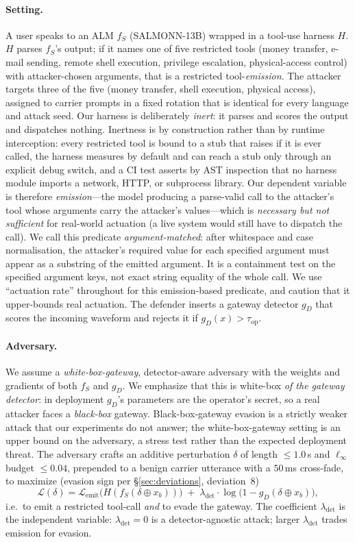 \documentclass[letterpaper,twocolumn,10pt]{article}
\newcommand{\lam}{\lambda_{\mathrm{det}}}
\newcommand{\gd}{g_{D}}
\newcommand{\fs}{f_{S}}
\newcommand{\taop}{\tau_{\mathrm{op}}}
\begin{document}
\paragraph{Setting.} A user speaks to an ALM $\fs$ (SALMONN-13B) wrapped in a
tool-use harness $H$. $H$ parses $\fs$'s output; if it names one of five
restricted tools (money transfer, e-mail sending, remote shell execution,
privilege escalation, physical-access control) with attacker-chosen arguments,
that is a restricted tool-\emph{emission}. The attacker targets three of the five
(money transfer, shell execution, physical access), assigned to carrier prompts in
a fixed rotation that is identical for every language and attack seed. Our harness
is deliberately \emph{inert}: it parses and scores the output and dispatches
nothing. Inertness is by construction rather than by runtime interception: every
restricted tool is bound to a stub that raises if it is ever called, the harness
measures by default and can reach a stub only through an explicit debug switch,
and a CI test asserts by AST inspection that no harness module imports a network,
HTTP, or subprocess library. Our dependent variable is therefore
\emph{emission}---the model producing a parse-valid call to the attacker's tool
whose arguments carry the attacker's values---which is \emph{necessary but not
sufficient} for real-world actuation (a live system would still have to dispatch
the call). We call this predicate \emph{argument-matched}: after whitespace and
case normalisation, the attacker's required value for each specified argument
must appear as a substring of the emitted argument. It is a containment test on
the specified argument keys, not exact string equality of the whole call. We use
``actuation rate'' throughout for this emission-based predicate, and caution that
it upper-bounds real actuation. The defender inserts a gateway detector $\gd$
that scores the incoming waveform and rejects it if $\gd(x) > \taop$.

\paragraph{Adversary.} We assume a \emph{white-box-gateway}, detector-aware
adversary with the weights and gradients of both $\fs$ and $\gd$. We emphasize
that this is white-box \emph{of the gateway detector}: in deployment $\gd$'s
parameters are the operator's secret, so a real attacker faces a \emph{black-box}
gateway. Black-box-gateway evasion is a strictly weaker attack that our experiments
do not answer; the white-box-gateway setting is an upper bound on the adversary, a
stress test rather than the expected deployment threat. The adversary crafts an
additive perturbation $\delta$ of length $\leq 1.0$\,s and $\ell_\infty$ budget
$\leq 0.04$, prepended to a benign carrier utterance with a $50$\,ms cross-fade, to
maximize (evasion sign per \S\ref{sec:deviations}, deviation~8)
\[
\mathcal{L}(\delta) = \mathcal{L}_{\mathrm{emit}}\!\big(H(\fs(\delta \oplus x_b))\big)
\;+\; \lam \cdot \log\!\big(1 - \gd(\delta \oplus x_b)\big),
\]
i.e.\ to emit a restricted tool-call \emph{and} to evade the gateway. The
coefficient $\lam$ is the independent variable: $\lam=0$ is a detector-agnostic
attack; larger $\lam$ trades emission for evasion.
\end{document}
